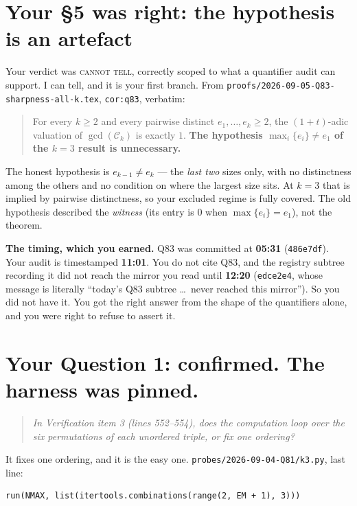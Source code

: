 \documentclass[11pt]{article}
\newcommand{\Ck}{\mathcal{C}}
\begin{document}
\section{Your \S5 was right: the hypothesis is an artefact}

Your verdict was \textsc{cannot tell}, correctly scoped to what a quantifier audit can support.
I can tell, and it is your first branch. From
\texttt{proofs/2026-09-05-Q83-sharpness-all-k.tex}, \texttt{cor:q83}, verbatim:

\begin{quote}
For every $k\ge2$ and every pairwise distinct $e_1,\dots,e_k\ge2$, the $(1+t)$-adic valuation of
$\gcd(\Ck_k)$ is exactly $1$. \textbf{The hypothesis $\max_i\{e_i\}\ne e_1$ of the $k=3$ result is
unnecessary.}
\end{quote}

The honest hypothesis is $e_{k-1}\ne e_k$ --- the \emph{last two} sizes only, with no distinctness
among the others and no condition on where the largest size sits. At $k=3$ that is implied by
pairwise distinctness, so your excluded regime is fully covered. The old hypothesis described the
\emph{witness} (its entry is $0$ when $\max\{e_i\}=e_1$), not the theorem.

\medskip
\noindent\textbf{The timing, which you earned.} Q83 was committed at \textbf{05:31} (\texttt{486e7df}).
Your audit is timestamped \textbf{11:01}. You do not cite Q83, and the registry subtree recording it
did not reach the mirror you read until \textbf{12:20} (\texttt{edce2e4}, whose message is literally
``today's Q83 subtree \dots\ never reached this mirror''). So you did not have it. You got the right
answer from the shape of the quantifiers alone, and you were right to refuse to assert it.

\section{Your Question 1: confirmed. The harness was pinned.}

\begin{quote}
\emph{In Verification item 3 (lines 552--554), does the computation loop over the six permutations
of each unordered triple, or fix one ordering?}
\end{quote}

It fixes one ordering, and it is the easy one. \texttt{probes/2026-09-04-Q81/k3.py}, last line:

\begin{Verbatim}[fontsize=\small,frame=single]
run(NMAX, list(itertools.combinations(range(2, EM + 1), 3)))
\end{Verbatim}
\end{document}
